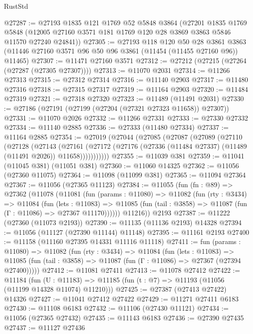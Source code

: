 \begin{lexlean}{RustStd}
\begin{coremodule}
@27287 := @27193
    @1835
    @121
    @1769
    @52
    @5848
    @3864
    (@27201
      @1835
      @1769
      @5848
      (@12005 @27160 @3571 @181 @1769 @120 @28 @3869 @3863 @5846 @11570 @27240 @24841))
@27305 := @27193
    @118
    @120
    @50
    @28
    @3861
    @3863
    (@11446 @27160 @3571 @96 @50 @96 @3861 (@11454 (@11455 @27160 @96)) @11465)
@27307 := @11471 @27160 @3571
@27312 := @27212 (@27215 (@27264 (@27287 (@27305 @27307))))
@27313 := @11070 @2031
@27314 := @11266 @27313
@27315 := @27312 @27314
@27316 := @11140 @2903
@27317 := @11480 @27316
@27318 := @27315 @27317
@27319 := @11164 @2903
@27320 := @11484 @27319
@27321 := @27318 @27320
@27323 := @11489 (@11491 @2031)
@27330 := @27186 (@27191 (@27199 (@27204 (@27321 @27323 @11658)) @27307))
@27331 := @11070 @2026
@27332 := @11266 @27331
@27333 := @27330 @27332
@27334 := @11140 @2885
@27336 := @27333 (@11480 @27334)
@27337 := @11164 @2885
@27354 := @27019
    (@27044
      (@27085
        (@27087
          (@27089
            (@27110
              (@27128
                (@27143
                  (@27161
                    (@27172
                      (@27176 (@27336 (@11484 @27337) (@11489 (@11491 @2026)) @11658)))))))))))
@27355 := @11039 @381
@27359 := @11041 (@11045 @381) (@11051 @381)
@27360 := @11060 @14325
@27362 := @11056 (@27360 @11075)
@27364 := @11098 (@11099 @381)
@27365 := @11094 @27364
@27367 := @11056 (@27365 @11123)
@27384 := @11055
    (fun (fn : @89) =>
    @27362
      (@11078
        (@11081
          (fun (params : @11080) =>
          @11082
            (fun (rty : @3434) =>
            @11084
              (fun (lets : @11083) =>
              @11085 (fun (tail : @3858) => @11087 (fun (Γ : @11086) => @27367 @11170))))))
        @11216))
    @2193
@27387 := @11222 (@27360 (@11073 @2193))
@27390 := @11135 (@11136 @2193) @14328
@27394 := @11056 (@11127 (@27390 @11144) @11148)
@27395 := @11161 @2193
@27400 := @11158 (@11160 @27395 @14331 @11116 @11118)
@27411 := fun (params : @11080) =>
  @11082
    (fun (rty : @3434) =>
    @11084
      (fun (lets : @11083) =>
      @11085 (fun (tail : @3858) => @11087 (fun (Γ : @11086) => @27367 (@27394 @27400)))))
@27412 := @11081 @27411
@27413 := @11078 @27412
@27422 := @11184
    (fun (U : @11183) => @11185 (fun (t : @7) => @11193 (@11056 (@11199 @14328 @11074) @11210)))
@27425 := @27387 (@27413 @27422) @14326
@27427 := @11041 @27412 @27422
@27429 := @11271 @27411 @6183
@27430 := @11108 @6183
@27432 := @11106 (@27430 @11121)
@27434 := @11056 (@27365 @27432)
@27435 := @11143 @6183
@27436 := @27390 @27435
@27437 := @11127 @27436

\end{coremodule}
\end{lexlean}

